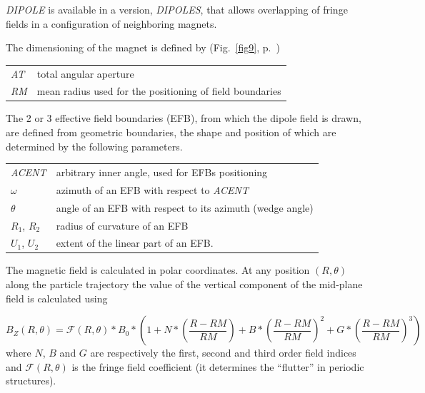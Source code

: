 {\noindent \textsl{DIPOLE}  is available in a version, \textsl{DIPOLES}, that allows overlapping of fringe fields 
in a configuration of neighboring magnets. 

\bigskip

\noindent The dimensioning of the magnet is defined by (Fig.~\ref{fig9}, p.~\pageref{fig9})

\bigskip

 \begin{tabular}{>{\sl}l!{~:}l}
	 AT &  total angular aperture \\
	 RM & mean radius used for the positioning of field boundaries\\
 \end{tabular}

\bigskip

\noindent The 2 or 3 effective field boundaries (EFB), from which  the dipole field  is drawn, are
defined from geometric boundaries, the shape and position of which are determined by the 
following parameters. 

\bigskip

\begin{tabular}{l!{~:}l}
	 \textsl{ACENT} 
	    & arbitrary inner angle, used for EFBs positioning  \\
	$\omega$ &  azimuth of an EFB with respect to  \textsl{ACENT}\\
	$\theta$ & angle of an EFB with respect to its azimuth (wedge angle)\\ 
	$R_1$, $R_2$  &  radius of curvature of an EFB\\
	$U_1$, $U_2$  &  extent of the linear part of an EFB. 
\end{tabular}

\bigskip


 \noindent The magnetic field is calculated in  polar
coordinates. At  any position $(R,\theta)$ along the  particle trajectory 
the value of the vertical component of the mid-plane field is calculated using

 \begin{equation}
	 B_Z(R,\theta) =  \mathcal{F}(R,\theta) \ast  B_0 \ast  
	      \left(1+N \ast  
	           \left( \dfrac{R-RM }{ RM}\right) 
	           + B \ast  \left(\dfrac{R-RM }{ RM} \right)^2 
	           + G \ast  \left(\dfrac{R-RM }{ RM} \right)^3 
	      \right) 
 	\label{eqBDipole}
 \end{equation}
 where  $ N$, $B $ and $ G $ are  respectively  the first, second and
third order field indices and $ \mathcal{F}(R,\theta)$ is the fringe field coefficient (it determines the ``flutter'' 
in periodic structures). 


}
